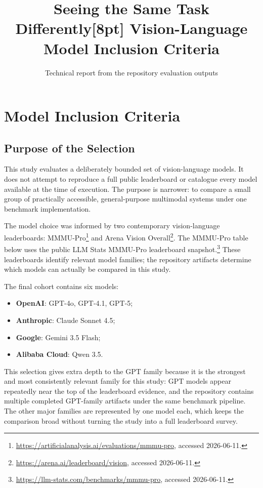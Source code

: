 \documentclass[11pt,a4paper]{report}
\title{\textbf{Seeing the Same Task Differently}[8pt]
Vision-Language Model Inclusion Criteria}
\author{Technical report from the repository evaluation outputs}
\date{}
\begin{document}
\maketitle

\chapter{Model Inclusion Criteria}

\section{Purpose of the Selection}

This study evaluates a deliberately bounded set of vision-language models. It
does not attempt to reproduce a full public leaderboard or catalogue every
model available at the time of execution. The purpose is narrower: to compare a
small group of practically accessible, general-purpose multimodal systems under
one benchmark implementation.

The model choice was informed by two contemporary vision-language leaderboards:
MMMU-Pro\footnote{\url{https://artificialanalysis.ai/evaluations/mmmu-pro}, accessed 2026-06-11.}
and Arena Vision Overall\footnote{\url{https://arena.ai/leaderboard/vision}, accessed 2026-06-11.}.
The MMMU-Pro table below uses the public LLM Stats MMMU-Pro leaderboard
snapshot.\footnote{\url{https://llm-stats.com/benchmarks/mmmu-pro}, accessed 2026-06-11.}
These leaderboards identify relevant model families; the repository artifacts
determine which models can actually be compared in this study.

The final cohort contains six models:

\begin{itemize}
\item \textbf{OpenAI}: GPT-4o, GPT-4.1, GPT-5;
\item \textbf{Anthropic}: Claude Sonnet 4.5;
\item \textbf{Google}: Gemini 3.5 Flash;
\item \textbf{Alibaba Cloud}: Qwen 3.5.
\end{itemize}

This selection gives extra depth to the GPT family because it is the strongest
and most consistently relevant family for this study: GPT models appear
repeatedly near the top of the leaderboard evidence, and the repository
contains multiple completed GPT-family artifacts under the same benchmark
pipeline. The other major families are represented by one model each, which
keeps the comparison broad without turning the study into a full leaderboard
survey.
\end{document}

